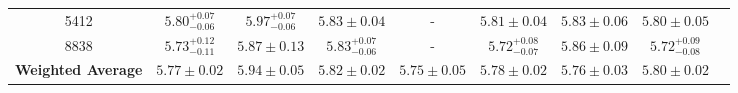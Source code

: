 \documentclass[fleqn,usenatbib]{mnras}
\begin{document}
\begin{table*}
\begin{tabular}{ccccccccc}
5412 & $5.80^{+0.07} _{-0.06}$ & $5.97^{+0.07} _{-0.06}$ & $5.83 \pm 0.04$ &  - & $5.81 \pm 0.04$ & $5.83 \pm 0.06$ &$5.80 \pm 0.05$  \\

8838 & $5.73^{+0.12} _{-0.11}$ & $5.87 \pm 0.13$ & $5.83^{+0.07} _{-0.06}$ & - & $5.72^{+0.08} _{-0.07}$ & $5.86 \pm 0.09$ &  $5.72^{+0.09} _{-0.08}$ \\

\textbf{Weighted Average} &\boldmath$5.77 \pm 0.02$ &\boldmath$5.94 \pm 0.05$ &\boldmath$5.82 \pm 0.02$ & \boldmath$5.75 \pm 0.05$ &\boldmath$5.78 \pm 0.02$&\boldmath$5.76 \pm 0.03$&\boldmath$5.80 \pm 0.02$
\\

\hline
\end{tabular}
\end{table*}
\end{document}
